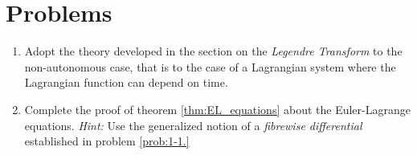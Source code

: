 \section*{Problems}

\begin{enumerate}[label = \thechapter-\arabic*.]
	\item \label{prob:1-1.} Adopt the theory developed in the section on the \emph{Legendre Transform} to the non-autonomous case, that is to the case of a Lagrangian system where the Lagrangian function can depend on time.
	\item Complete the proof of theorem \ref{thm:EL_equations} about the Euler-Lagrange equations. \emph{Hint:} Use the generalized notion of a \emph{fibrewise differential} established in problem \ref{prob:1-1.}
\end{enumerate}
